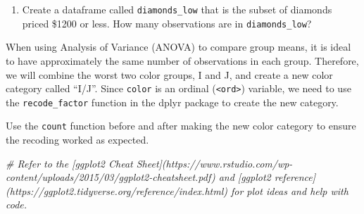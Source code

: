 \documentclass[]{book}
\newenvironment{Shaded}{\begin{snugshade}}{\end{snugshade}}
\newcommand{\KeywordTok}[1]{\textcolor[rgb]{0.13,0.29,0.53}{\textbf{#1}}}
\newcommand{\DataTypeTok}[1]{\textcolor[rgb]{0.13,0.29,0.53}{#1}}
\newcommand{\StringTok}[1]{\textcolor[rgb]{0.31,0.60,0.02}{#1}}
\newcommand{\CommentTok}[1]{\textcolor[rgb]{0.56,0.35,0.01}{\textit{#1}}}
\newcommand{\OperatorTok}[1]{\textcolor[rgb]{0.81,0.36,0.00}{\textbf{#1}}}
\newcommand{\NormalTok}[1]{#1}
\providecommand{\tightlist}{%
  \setlength{\itemsep}{0pt}\setlength{\parskip}{0pt}}
\begin{document}
\begin{enumerate}
\def\labelenumi{\arabic{enumi}.}
\tightlist
\item
  Create a dataframe called \texttt{diamonds\_low} that is the subset of
  diamonds priced \$1200 or less. How many observations are in
  \texttt{diamonds\_low}?
\end{enumerate}

When using Analysis of Variance (ANOVA) to compare group means, it is
ideal to have approximately the same number of observations in each
group. Therefore, we will combine the worst two color groups, I and J,
and create a new color category called ``I/J''. Since \texttt{color} is
an ordinal (\texttt{\textless{}ord\textgreater{}}) variable, we need to
use the \texttt{recode\_factor} function in the dplyr package to create
the new category.

Use the \texttt{count} function before and after making the new color
category to ensure the recoding worked as expected.

\begin{Shaded}
\end{Shaded}

\begin{Shaded}
\end{Shaded}

\begin{Shaded}
\begin{Highlighting}[]
\CommentTok{# Refer to the [ggplot2 Cheat Sheet](https://www.rstudio.com/wp-content/uploads/2015/03/ggplot2-cheatsheet.pdf) and [ggplot2 reference](https://ggplot2.tidyverse.org/reference/index.html) for plot ideas and help with code.}
\end{Highlighting}
\end{Shaded}
\end{document}
